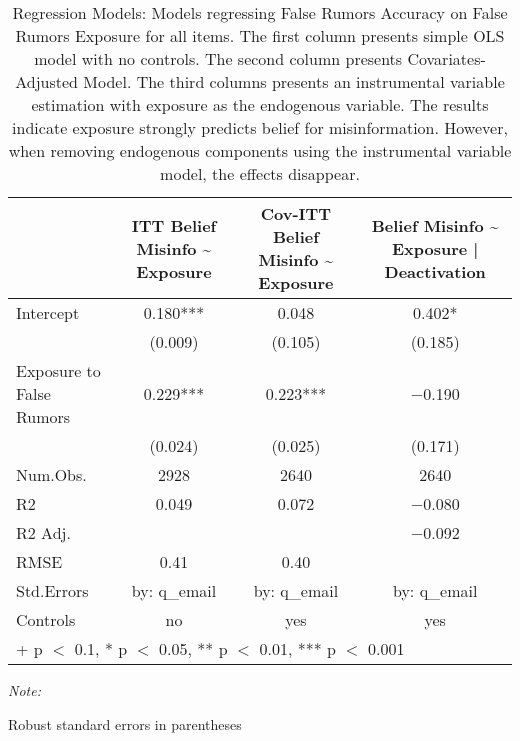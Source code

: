 \begin{table}
\caption{Regression Models: Models regressing False Rumors Accuracy on False Rumors Exposure for all items. The first column presents simple OLS model with no controls. The second column presents Covariates-Adjusted Model. The third columns presents an instrumental variable estimation with exposure as the endogenous variable. The results indicate exposure strongly predicts belief for misinformation. However, when removing endogenous components using the instrumental variable model, the effects disappear.}
\centering
\begin{threeparttable}
\begin{tabular}[t]{lccc}
\toprule
  & ITT Belief Misinfo \textasciitilde{} Exposure & Cov-ITT Belief Misinfo \textasciitilde{} Exposure &  Belief Misinfo \textasciitilde{} Exposure | Deactivation\\
\midrule
Intercept & \num{0.180}*** & \num{0.048} & \num{0.402}*\\
 & (\num{0.009}) & (\num{0.105}) & (\num{0.185})\\
Exposure to False Rumors & \num{0.229}*** & \num{0.223}*** & \num{-0.190}\\
 & (\num{0.024}) & (\num{0.025}) & (\num{0.171})\\
\midrule
Num.Obs. & \num{2928} & \num{2640} & \num{2640}\\
R2 & \num{0.049} & \num{0.072} & \num{-0.080}\\
R2 Adj. &  &  & \num{-0.092}\\
RMSE & \num{0.41} & \num{0.40} & \\
Std.Errors & by: q\_email & by: q\_email & by: q\_email\\
Controls & no & yes & yes\\
\bottomrule
\multicolumn{4}{l}{\rule{0pt}{1em}+ p $<$ 0.1, * p $<$ 0.05, ** p $<$ 0.01, *** p $<$ 0.001}\\
\end{tabular}
\begin{tablenotes}
\item \textit{Note: } 
\item Robust standard errors in parentheses
\end{tablenotes}
\end{threeparttable}
\end{table}
